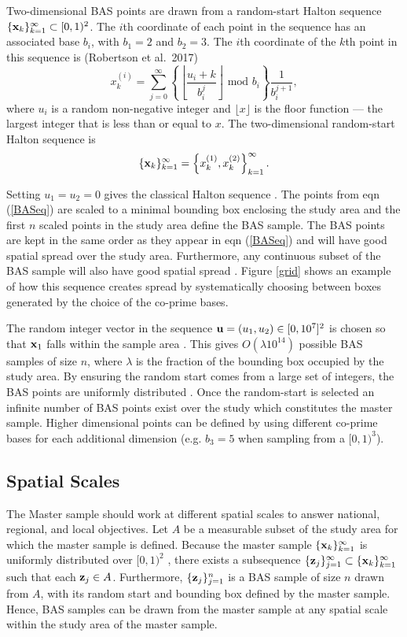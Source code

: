\documentclass[titlepage]{article}
\begin{document}
Two-dimensional BAS points are drawn from a random-start Halton sequence $\{{\bf x}_k\}_{k=1}^{\infty} \subset [0,1)^2$. The $i$th coordinate of each point in the sequence has an associated base $b_i$, with $b_1 = 2$ and $b_2 = 3$. The $i$th coordinate of the $k$th point in this sequence is (Robertson et al.\ 2017)
$$
x_k^{(i)} = \sum_{j = 0}^{\infty} \left\{\left\lfloor \frac{u_i + k}{b_i^j} \right\rfloor \text{ mod } b_i \right\}\frac{1}{b_i^{j+1}},
$$
where $u_i$ is a random non-negative integer and $\lfloor x \rfloor$ is the floor function --- the largest integer that is less than or equal to $x$. The two-dimensional random-start Halton sequence is 
\begin{equation}\label{BASeq}
\{{\bf x}_k\}_{k=1}^{\infty} = \left\{x_k^{(1)}, x_k^{(2)}\right\}_{k=1}^{\infty}.
\end{equation}

Setting $u_1 = u_2 = 0$ gives the classical Halton sequence \citep{Halton1960}. The points from eqn (\ref{BASeq}) are scaled to a minimal bounding box enclosing the study area and the first $n$ scaled points in the study area define the BAS sample. The BAS points are kept in the same order as they appear in eqn (\ref{BASeq}) and will have good spatial spread over the study area. Furthermore, any continuous subset of the BAS sample will also have good spatial spread \citep{Robertson2017}. Figure \ref{grid} shows an example of how this sequence creates spread by systematically choosing between boxes generated by the choice of the co-prime bases.

The random integer vector in the sequence ${\bf u} = (u_1, u_2) \in [0,10^7]^2$ is chosen so that ${\bf x}_1$ falls within the sample area \citep{Robertson2017}. This gives $O(\lambda 10^{14})$ possible BAS samples of size $n$, where $\lambda$ is the fraction of the bounding box occupied by the study area. By ensuring the random start comes from a large set of integers, the BAS points are uniformly distributed \citep{Robertson2013}. Once the random-start is selected an infinite number of BAS points exist over the study which constitutes the master sample. Higher dimensional points can be defined by using different co-prime bases for each additional dimension (e.g. $b_3 = 5$ when sampling from a $[0,1)^3$).

\subsection{Spatial Scales}
The Master sample should work at different spatial scales to answer national, regional, and local objectives. Let $A$ be a measurable subset of the study area for which the master sample is defined. Because the master sample $\{{\bf x}_k\}_{k=1}^{\infty}$ is uniformly distributed over $[0,1)^2$ \citep{Wang2000}, there exists a subsequence $\{{\bf z}_j\}_{j=1}^{\infty} \subset \{{\bf x}_k\}_{k=1}^{\infty}$ such that each ${\bf z}_j \in A$. Furthermore, $\{{\bf z}_j\}_{j=1}^n$ is a BAS sample of size $n$ drawn from $A$, with its random start and bounding box defined by the master sample. Hence, BAS samples can be drawn from the master sample at any spatial scale within the study area of the master sample.
\end{document}
